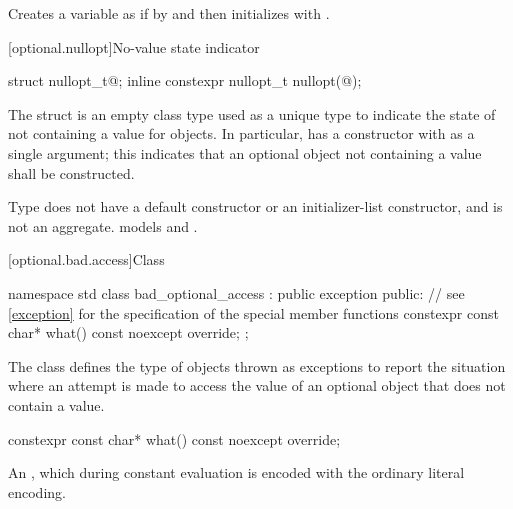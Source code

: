 \begin{itemdescr}
\pnum
\effects
Creates a variable  as if by 
and then initializes  with .
\end{itemdescr}

[optional.nullopt]{No-value state indicator}

%
%
\begin{itemdecl}
struct nullopt_t{@\seebelow@};
inline constexpr nullopt_t nullopt(@\unspec@);
\end{itemdecl}

\pnum
The struct  is an empty class type used as a unique type to indicate the state of not containing a value for  objects.
In particular,  has a constructor with  as a single argument;
this indicates that an optional object not containing a value shall be constructed.

\pnum
Type  does not have
a default constructor or an initializer-list constructor, and
is not an aggregate.
 models  and
.

[optional.bad.access]{Class }

\begin{codeblock}
namespace std {
  class bad_optional_access : public exception {
  public:
    // see \ref{exception} for the specification of the special member functions
    constexpr const char* what() const noexcept override;
  };
}
\end{codeblock}

\pnum
The class  defines the type of objects thrown as exceptions to report the situation where an attempt is made to access the value of an optional object that does not contain a value.

%
\begin{itemdecl}
constexpr const char* what() const noexcept override;
\end{itemdecl}

\begin{itemdescr}
\pnum
\returns
An  \ntbs{},
which during constant evaluation is encoded with
the ordinary literal encoding.
\end{itemdescr}

